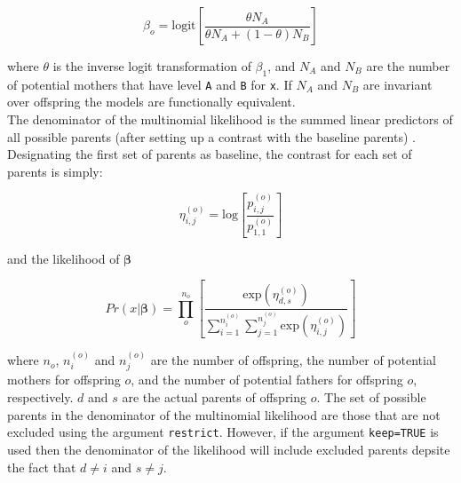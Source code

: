 \documentclass{article}
\begin{document}
\begin{equation}
\beta_{o}  = \textrm{logit}\left[\frac{\theta N_{A}}{\theta N_{A} + (1-\theta)N_{B}}\right]
\end{equation}

where $\theta$ is the inverse logit transformation of $\beta_{1}$, and $N_{A}$ and $N_{B}$ are the number of potential mothers that have level \texttt{A} and \texttt{B} for \texttt{x}. If $N_{A}$ and $N_{B}$ are invariant over offspring the models are functionally equivalent.\\

The denominator of the multinomial likelihood is the summed linear predictors of all possible parents (after setting up a contrast with the baseline parents) \citep{Smouse.1999}.  Designating the first set of parents as baseline, the contrast for each set of parents is simply:

\begin{equation}
\eta^{(o)}_{i,j}  = \textrm{log}\left[\frac{p^{(o)}_{i,j}}{p^{(o)}_{1,1}}\right]
\end{equation}

and the likelihood of $\bm{\beta}$

\begin{equation}
Pr(x|\bm{\beta})  = \prod^{n_{o}}_{o}\left[\frac{\textrm{exp}(\eta^{(o)}_{d,s})}{\sum^{n^{(o)}_{i}}_{i=1}\sum^{n^{(o)}_{j}}_{j=1}\textrm{exp}(\eta^{(o)}_{i,j})}\right] 
\end{equation}

where $n_{o}$, $n^{(o)}_{i}$ and $n^{(o)}_{j}$ are the number of offspring, the number of potential mothers for offspring $o$, and the number of potential fathers for offspring $o$, respectively.  $d$ and $s$ are the actual parents of offspring $o$. The set of possible parents  in the denominator of the multinomial likelihood are those that are not excluded using the argument \texttt{restrict}. However, if the argument \texttt{keep=TRUE} is used then the denominator of the likelihood will include excluded parents depsite the fact that $d \neq i$ and $s \neq j$.




\end{document}
